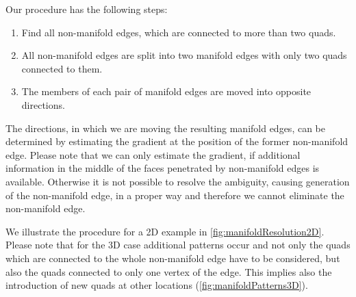 Our procedure has the following steps:
\begin{enumerate}
\item Find all non-manifold edges, which are connected to more than two \acp{quad}.
\item All non-manifold edges are split into two manifold edges with only two \acp{quad} connected to them.
\item The members of each pair of manifold edges are moved into opposite directions. 
\end{enumerate}
The directions, in which we are moving the resulting manifold edges, can be determined by estimating the gradient at the position of the former non-manifold edge. Please note that we can only estimate the gradient, if additional information in the middle of the faces penetrated by non-manifold edges is available. Otherwise it is not possible to resolve the ambiguity, causing generation of the non-manifold edge, in a proper way and therefore we cannot eliminate the non-manifold edge.

We illustrate the procedure for a 2D example in \autoref{fig:manifoldResolution2D}. Please note that for the 3D case additional patterns occur and not only the \acp{quad} which are connected to the whole non-manifold edge have to be considered, but also the \acp{quad} connected to only one vertex of the edge. This implies also the introduction of new \acp{quad} at other locations (\autoref{fig:manifoldPatterns3D}).

